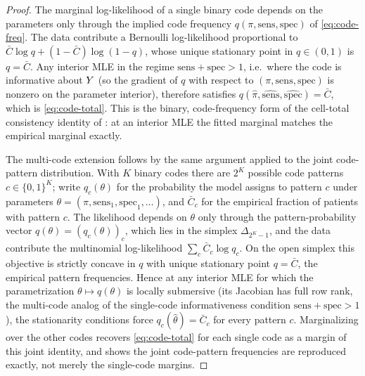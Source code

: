 \begin{proof}
The marginal log-likelihood of a single binary code depends on the
parameters only through the implied code frequency $q(\pi,
\mathrm{sens}, \mathrm{spec})$ of \eqref{eq:code-freq}. The data
contribute a Bernoulli log-likelihood proportional to $\bar{C}\log q +
(1 - \bar{C})\log(1 - q)$, whose unique stationary point in $q \in
(0,1)$ is $q = \bar{C}$. Any interior MLE in the regime $\mathrm{sens} + \mathrm{spec} > 1$,
i.e.\ where the code is informative about $Y$ (so the gradient of $q$
with respect to $(\pi, \mathrm{sens}, \mathrm{spec})$ is nonzero on the
parameter interior), therefore satisfies $q(\hat\pi,
\widehat{\mathrm{sens}}, \widehat{\mathrm{spec}}) = \bar{C}$, which is
\eqref{eq:code-total}. This is the binary, code-frequency form of the
cell-total consistency identity of \citet[\S 3]{towell2026scrnacoarsening}:
at an interior MLE the fitted marginal matches the empirical marginal
exactly.

The multi-code extension follows by the same argument applied to the
joint code-pattern distribution. With $K$ binary codes there are $2^K$
possible code patterns $c \in \{0,1\}^K$; write $q_c(\theta)$ for the
probability the model assigns to pattern $c$ under parameters $\theta =
(\pi, \mathrm{sens}_1, \mathrm{spec}_1, \dots)$, and $\bar{C}_c$ for the
empirical fraction of patients with pattern $c$. The likelihood depends
on $\theta$ only through the pattern-probability vector $q(\theta) =
(q_c(\theta))_{c}$, which lies in the simplex $\Delta_{2^K - 1}$, and the
data contribute the multinomial log-likelihood $\sum_c \bar{C}_c \log
q_c$. On the open simplex this objective is strictly concave in $q$ with
unique stationary point $q = \bar{C}$, the empirical pattern frequencies.
Hence at any interior MLE for which the parametrization $\theta \mapsto
q(\theta)$ is locally submersive (its Jacobian has full row rank, the
multi-code analog of the single-code informativeness condition
$\mathrm{sens} + \mathrm{spec} > 1$), the stationarity conditions force
$q_c(\hat\theta) = \bar{C}_c$ for every pattern $c$. Marginalizing over
the other codes recovers \eqref{eq:code-total} for each single code as a
margin of this joint identity, and shows the joint code-pattern
frequencies are reproduced exactly, not merely the single-code margins.
\end{proof}

